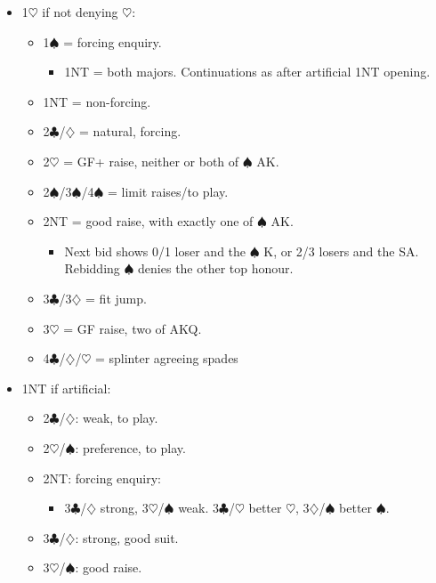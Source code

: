 \documentclass[a4paper,12pt]{article}
\begin{document}
\begin{itemize}
\item 1$\heartsuit$ if not denying $\heartsuit$:
	\begin{itemize}
   \item 1$\spadesuit$ = forcing enquiry.
		\begin{itemize}
      \item 1NT = both majors. Continuations as after artificial 1NT opening.
		\end{itemize}
   \item 1NT = non-forcing.
   \item 2$\clubsuit$/$\diamondsuit$ = natural, forcing.
   \item 2$\heartsuit$ = GF+ raise, neither or both of $\spadesuit$ AK.
   \item 2$\spadesuit$/3$\spadesuit$/4$\spadesuit$ = limit raises/to play.
   \item 2NT = good raise, with exactly one of $\spadesuit$ AK.
		\begin{itemize}
      \item Next bid shows 0/1 loser and the $\spadesuit$ K, or 2/3 losers and the SA.
         Rebidding $\spadesuit$ denies the other top honour.
		\end{itemize}
   \item 3$\clubsuit$/3$\diamondsuit$ = fit jump.
   \item 3$\heartsuit$ = GF raise, two of AKQ.
   \item 4$\clubsuit$/$\diamondsuit$/$\heartsuit$ = splinter agreeing spades
	\end{itemize}

\item 1NT if artificial:
	\begin{itemize}
   \item 2$\clubsuit$/$\diamondsuit$: weak, to play.
   \item 2$\heartsuit$/$\spadesuit$: preference, to play.
   \item 2NT: forcing enquiry:
		\begin{itemize}
      \item 3$\clubsuit$/$\diamondsuit$ strong, 3$\heartsuit$/$\spadesuit$ weak. 3$\clubsuit$/$\heartsuit$ better $\heartsuit$, 3$\diamondsuit$/$\spadesuit$ better $\spadesuit$.
		\end{itemize}
   \item 3$\clubsuit$/$\diamondsuit$: strong, good suit.
   \item 3$\heartsuit$/$\spadesuit$: good raise.
	\end{itemize}


\end{itemize}
\end{document}
